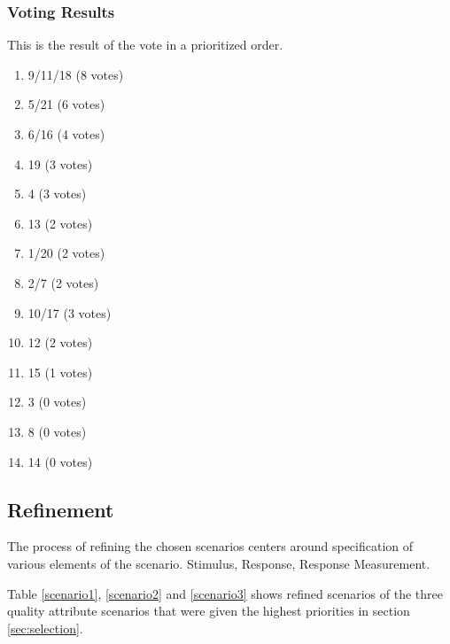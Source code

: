 \documentclass[a4paper,10pt]{article}
\begin{document}
\subsubsection{Voting Results}

This is the result of the vote in a prioritized order.
\begin{enumerate}
\item 9/11/18 (8 votes)
\item 5/21 (6 votes)
\item 6/16 (4 votes)
\item 19 (3 votes)
\item 4 (3 votes)
\item 13 (2 votes)
\item 1/20 (2 votes)
\item 2/7 (2 votes)
\item 10/17 (3 votes)
\item 12 (2 votes)
\item 15 (1 votes)
\item 3 (0 votes)
\item 8 (0 votes)
\item 14 (0 votes)
\end{enumerate}


\subsection{Refinement}
The process of refining the chosen scenarios centers around specification of various elements of the scenario. Stimulus, Response, Response Measurement. 

Table \ref{scenario1}, \ref{scenario2} and \ref{scenario3} shows refined scenarios of the three
quality attribute scenarios that were given the highest priorities in section \ref{sec:selection}.
\end{document}
